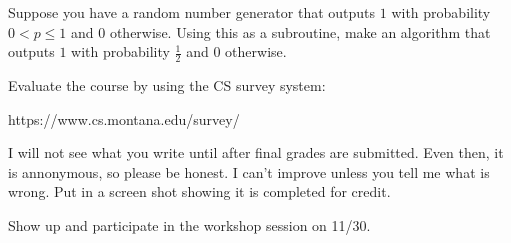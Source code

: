 \documentclass[12pt]{article}
\newenvironment{problem}[2][Problem]
{\begin{trivlist}
\item[\hskip \labelsep {\bfseries #1}\hskip \labelsep {\bfseries #2.}]}{\end{trivlist}}
\begin{document}
\begin{problem}{2}
Suppose you have a random number generator that outputs $1$ with probability $0 < p \le 1$ and $0$ otherwise. Using this as a subroutine, make an algorithm that outputs $1$ with probability $\frac{1}{2}$ and $0$ otherwise.
\end{problem}

\begin{problem}{3*}
Evaluate the course by using the CS survey system: 

https://www.cs.montana.edu/survey/

I will not see what you write until after final grades are submitted. Even then, it is annonymous, so please be honest. I can't improve unless you tell me what is wrong. Put in a screen shot showing it is completed for credit.
\end{problem}

\begin{problem}{4}
Show up and participate in the workshop session on 11/30.
\end{problem}
 
\end{document}
